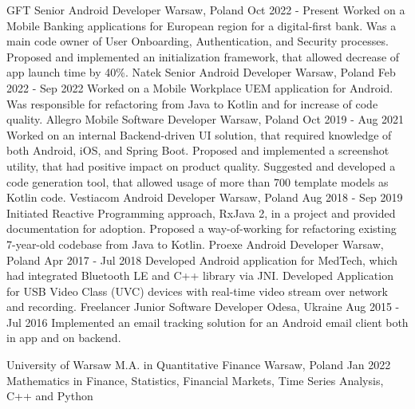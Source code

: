 \documentclass[10pt]{ms-cv}
\begin{document}
\cvexperience
  {GFT}
  {Senior Android Developer}
  {Warsaw, Poland}
  {Oct 2022 - Present}
  {
    Worked on a Mobile Banking applications for European region for a digital-first bank.
    \newline
    Was a main code owner of User Onboarding, Authentication, and Security processes.
    \newline
    Proposed and implemented an initialization framework, that allowed decrease of app launch time by 40\%.
  }
\cvexperience
  {Natek}
  {Senior Android Developer}
  {Warsaw, Poland}
  {Feb 2022 - Sep 2022}
  {
    Worked on a Mobile Workplace UEM application for Android.
    \newline
    Was responsible for refactoring from Java to Kotlin and for increase of code quality.
  }
\cvexperience
  {Allegro}
  {Mobile Software Developer}
  {Warsaw, Poland}
  {Oct 2019 - Aug 2021}
  {
    Worked on an internal Backend-driven UI solution, that required knowledge of both Android, iOS, and Spring Boot.
    \newline
    Proposed and implemented a screenshot utility, that had positive impact on product quality.
    \newline
    Suggested and developed a code generation tool, that allowed usage of more than 700 template models as Kotlin code.
  }
\cvexperience
  {Vestiacom}
  {Android Developer}
  {Warsaw, Poland}
  {Aug 2018 - Sep 2019}
  {
    Initiated Reactive Programming approach, RxJava 2, in a project and provided documentation for adoption.
    \newline
    Proposed a way-of-working for refactoring existing 7-year-old codebase from Java to Kotlin.
  }
\cvexperience
  {Proexe}
  {Android Developer}
  {Warsaw, Poland}
  {Apr 2017 - Jul 2018}
  {
    Developed Android application for MedTech, which had integrated Bluetooth LE and C++ library via JNI.
    \newline
    Developed Application for USB Video Class (UVC) devices with real-time video stream over network and recording.
  }
\cvexperience
  {Freelancer}
  {Junior Software Developer}
  {Odesa, Ukraine}
  {Aug 2015 - Jul 2016}
  {
    Implemented an email tracking solution for an Android email client both in app and on backend.
  }

\vspace{\baselineskip}

\cvexperience
  {University of Warsaw}
  {M.A. in Quantitative Finance}
  {Warsaw, Poland}
  {Jan 2022}
  {Mathematics in Finance, Statistics, Financial Markets, Time Series Analysis, C++ and Python}

\end{document}
